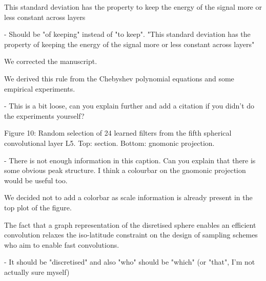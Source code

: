 \documentclass[12pt,a4paper]{article}
\newcommand{\nati}[1]{{\color[rgb]{.1,.6,.1}{NP: #1}}}
\newcommand{\TK}[1]{{\color{red}{TK: #1}}}
\newcommand{\todo}[1]{{\color[rgb]{.6,.1,.6}{TODO: #1}}}
\newcommand{\1}{\b{1}}              %
\newcommand{\0}{\b{0}}              %
\begin{document}
\begin{mdframed}[style=comment]
This standard deviation has the property to keep the energy of the signal more or less constant across layers

- Should be "of keeping" instead of "to keep". "This standard deviation has the property of keeping the energy of the signal more or less constant across layers"
\end{mdframed}
We corrected the manuscript.

\begin{mdframed}[style=comment]
We derived this rule from the Chebyshev polynomial equations and some empirical experiments.

- This is a bit loose, can you explain further and add a citation if you didn't do the experiments yourself?
\end{mdframed}
\todo{Assign: @nati, @michael}
\nati{We would need an appendix to do that. It is the last figure of the figure’s notebook (expected filter). I could spend two hours and write some equation... @michael, what do you think?}

\begin{mdframed}[style=comment]
Figure 10: Random selection of 24 learned filters from the fifth spherical convolutional layer L5. Top: section. Bottom: gnomonic projection.

- There is not enough information in this caption. Can you explain that there is some obvious peak structure. I think a colourbar on the gnomonic projection would be useful too.
\end{mdframed}
\todo{Assign: @all}
\nati{The problem is that random filters are picky as well and look very similar. Should we say that? I do not think a colorbar is necessary since there are numbered axes on the top plots. Do you agree?}

We decided not to add a colorbar as scale information is already present in the top plot of the figure.

\begin{mdframed}[style=comment]
The fact that a graph representation of the disretised sphere enables an efficient convolution relaxes the iso-latitude constraint on the design of sampling schemes who aim to enable fast convolutions.

- It should be "discretised" and also "who" should be "which" (or "that", I'm not actually sure myself)
\end{mdframed}
\todo{Assign: @tomek -> \nati{I corrected it with "which". Do you agree? }}
\TK{Sounds good to me.}
\end{document}
